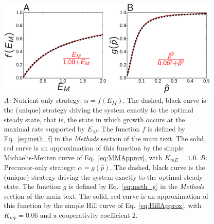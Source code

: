 \documentclass[a4paper,12pt]{article}
\newcommand{\tr}[1]{{#1}}
\begin{document}
\begin{flushleft}
{\Large
\textbf{}
}
\newline

\end{flushleft}

\begin{figure}[!h]
\centering
\includegraphics[width=\textwidth]{./Fig/plot_strategies.eps}
\caption{
\noindent\textit{A:} Nutrient-only strategy: $\alpha = f(E_M)$.
The dashed, black curve is the (unique) strategy driving the system exactly to the optimal steady state, that is, the state in which growth occurs at the maximal rate supported by $E_M$.
\tr{The function $f$ is defined by Eq.~\ref{eq:meth_f} in the \textit{Methods} section of the main text.}
The solid, red curve is an approximation of this function by the simple Michaelis-Menten curve of Eq.~\ref{eq:MMApprox}, with $K_{mE} = 1.0$.
\textit{B:} Precursor-only strategy: $\alpha = g(\hat{p})$.
The dashed, black curve is the (unique) strategy driving the system exactly to the optimal steady state.
\tr{The function $g$ is defined by Eq.~\ref{eq:meth_g} in the \textit{Methods} section of the main text.}
The solid, red curve is an approximation of this function by the simple Hill curve of Eq.~\ref{eq:HillApprox}, with $K_{mp} = 0.06$ and a cooperativity coefficient 2.}
\end{figure}
\end{document}
